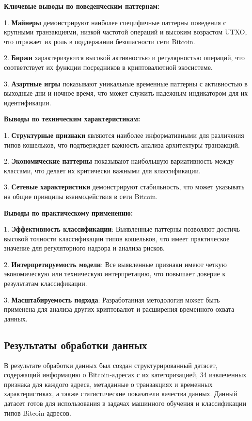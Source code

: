 \textbf{Ключевые выводы по поведенческим паттернам:}

1. \textbf{Майнеры} демонстрируют наиболее специфичные паттерны поведения с крупными транзакциями, низкой частотой операций и высоким возрастом UTXO, что отражает их роль в поддержании безопасности сети Bitcoin.

2. \textbf{Биржи} характеризуются высокой активностью и регулярностью операций, что соответствует их функции посредников в криптовалютной экосистеме.

3. \textbf{Азартные игры} показывают уникальные временные паттерны с активностью в выходные дни и ночное время, что может служить надежным индикатором для их идентификации.

\textbf{Выводы по техническим характеристикам:}

1. \textbf{Структурные признаки} являются наиболее информативными для различения типов кошельков, что подтверждает важность анализа архитектуры транзакций.

2. \textbf{Экономические паттерны} показывают наибольшую вариативность между классами, что делает их критически важными для классификации.

3. \textbf{Сетевые характеристики} демонстрируют стабильность, что может указывать на общие принципы взаимодействия в сети Bitcoin.

\textbf{Выводы по практическому применению:}

1. \textbf{Эффективность классификации}: Выявленные паттерны позволяют достичь высокой точности классификации типов кошельков, что имеет практическое значение для регуляторного надзора и анализа рисков.

2. \textbf{Интерпретируемость модели}: Все выявленные признаки имеют четкую экономическую или техническую интерпретацию, что повышает доверие к результатам классификации.

3. \textbf{Масштабируемость подхода}: Разработанная методология может быть применена для анализа других криптовалют и расширения временного охвата данных.

\subsection{Результаты обработки данных}

В результате обработки данных был создан структурированный датасет, содержащий информацию о Bitcoin-адресах с их категоризацией, 34 извлеченных признака для каждого адреса, метаданные о транзакциях и временных характеристиках, а также статистические показатели качества данных. Данный датасет готов для использования в задачах машинного обучения и классификации типов Bitcoin-адресов.

